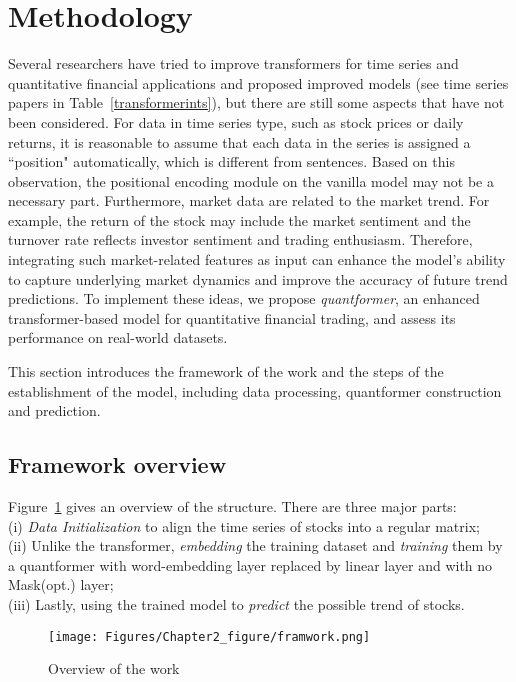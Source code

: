 \documentclass[preprint,12pt]{elsarticle}
\begin{document}
\section{Methodology} \label{method}
Several researchers have tried to improve transformers for time series and quantitative financial applications and proposed improved models (see time series papers in Table~\ref{transformerints}), but there are still some aspects that have not been considered. For data in time series type, such as stock prices or daily returns, it is reasonable to assume that each data in the series is assigned a ``position" automatically, which is different from sentences. Based on this observation, the positional encoding module on the vanilla model may not be a necessary part. Furthermore, market data are related to the market trend. For example, the return of the stock may include the market sentiment and the turnover rate reflects investor sentiment and trading enthusiasm. Therefore, integrating such market-related features as input can enhance the model's ability to capture underlying market dynamics and improve the accuracy of future trend predictions. To implement these ideas, we propose \emph{quantformer}, an enhanced transformer-based model for quantitative financial trading, and assess its performance on real-world datasets. 

This section introduces the framework of the work and the steps of the establishment of the model, including data processing, quantformer construction and prediction. 


\subsection{Framework overview}
Figure~\ref{framework}  gives an overview of the structure. There are three major parts: \\
(i) \textit{Data Initialization} to align the time series of stocks into a regular matrix; \\
(ii) Unlike the transformer, \textit{embedding} the training dataset and \textit{training} them by a quantformer with word-embedding layer replaced by linear layer and with no Mask(opt.) layer;\\
(iii) Lastly, using the trained model to \textit{predict} the possible trend of stocks.

        \begin{figure}[ht]
        \begin{center}
        \texttt{[image: Figures/Chapter2\_figure/framwork.png]}
        \renewcommand{\figurename}{Figure}
        \caption{Overview of the work}
        \label{framework}
        \end{center}
        \end{figure}
\end{document}
